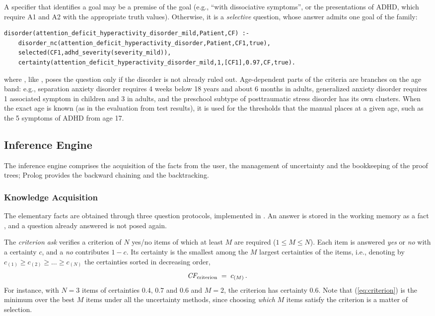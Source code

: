 A specifier that identifies a goal may be a premise of the goal (e.g., ``with
dissociative symptoms'', or the presentations of ADHD, which require A1 and A2
with the appropriate truth values). Otherwise, it is a \emph{selective}
question, whose answer admits one goal of the family:

\begin{lstlisting}
disorder(attention_deficit_hyperactivity_disorder_mild,Patient,CF) :-
    disorder_nc(attention_deficit_hyperactivity_disorder,Patient,CF1,true),
    selected(CF1,adhd_severity(severity_mild)),
    certainty(attention_deficit_hyperactivity_disorder_mild,1,[CF1],0.97,CF,true).
\end{lstlisting}

where , like , poses the question only
if the disorder is not already ruled out. Age-dependent parts of the
criteria are branches on the age band: e.g., separation anxiety disorder
requires 4 weeks below 18 years and about 6 months in adults, generalized
anxiety disorder requires 1 associated symptom in children and 3 in adults, and
the preschool subtype of posttraumatic stress disorder has its own clusters.
When the exact age is known (as in the evaluation from test results), it is
used for the thresholds that the manual places at a given age, such as the 5
symptoms of ADHD from age 17.

\subsection{Inference Engine}

The inference engine comprises the acquisition of the facts from the user, the
management of uncertainty and the bookkeeping of the proof trees; Prolog provides the backward chaining and the backtracking.

\subsubsection{Knowledge Acquisition}
\label{sec:acquisition}

The elementary facts are obtained through three question protocols,
implemented in . An answer is stored in the working memory as a
fact , and a question already answered
is not posed again.

The \emph{criterion ask} verifies a criterion of $N$ yes/no items of which at
least $M$ are required ($1 \le M \le N$). Each item is answered \emph{yes} or
\emph{no} with a certainty $c$, and a \emph{no} contributes $1-c$. Its certainty
is the smallest among the $M$ largest certainties of the items,
i.e., denoting by $c_{(1)} \ge c_{(2)} \ge \dots \ge c_{(N)}$ the certainties
sorted in decreasing order,
\begin{equation}\label{eq:criterion}
\textit{CF}_{\text{criterion}} \;=\; c_{(M)} \,.
\end{equation}
For instance, with $N=3$ items of certainties $0.4$, $0.7$ and $0.6$ and $M=2$,
the criterion has certainty $0.6$. Note that (\ref{eq:criterion}) is the minimum over the best $M$ items under all
the uncertainty methods, since choosing \emph{which} $M$ items satisfy the
criterion is a matter of selection.


